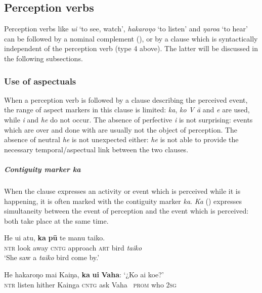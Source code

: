 \subsection{Perception verbs}\label{sec:11.3.1}
Perception verbs like \textit{u{\ꞌ}i} ‘to see, watch’, \textit{hakaroŋo} ‘to listen’ and \textit{ŋaro{\ꞌ}a} ‘to hear’ can be followed by a nominal complement (), or by a clause which is syntactically independent of the perception verb (type 4 above). The latter will be discussed in the following subsections.

\subsubsection[Use of aspectuals ]{Use of aspectuals} \label{sec:11.3.1.1}

When a perception verb is followed by a clause describing the perceived event, the range of aspect markers in this clause is limited: \textit{ka}, \textit{ko V {\ꞌ}ā} and \textit{e} are used, while \textit{i} and \textit{he} do not occur. The absence of perfective \textit{i} is not surprising: events which are over and done with are usually not the object of perception. The absence of neutral \textit{he} is not unexpected either: \textit{he} is not able to provide the necessary temporal/aspectual link between the two clauses.

\subparagraph{Contiguity marker \textit{ka}} When the clause expresses an activity or event which is perceived while it is happening, it is often marked with the contiguity marker \textit{ka}. \textit{Ka} () expresses simultaneity between the event of perception and the event which is perceived: both take place at the same time. 

\ea\label{ex:11.33}
\gll He u{\ꞌ}i atu, \textbf{ka} \textbf{pū} te manu taiko. \\
\textsc{ntr} look away \textsc{cntg} approach \textsc{art} bird \textit{taiko} \\

\glt 
‘She saw a \textit{taiko} bird come by.’ \textstyleExampleref{[Ley-9-55.078]}
\z

\ea\label{ex:11.34}
\gll He hakaroŋo mai Kaiŋa, \textbf{ka} \textbf{{\ꞌ}ui} \textbf{Vaha}: ‘¿Ko ai koe?’\\
\textsc{ntr} listen hither Kainga \textsc{cntg} ask Vaha ~\textsc{prom} who \textsc{2sg}\\

